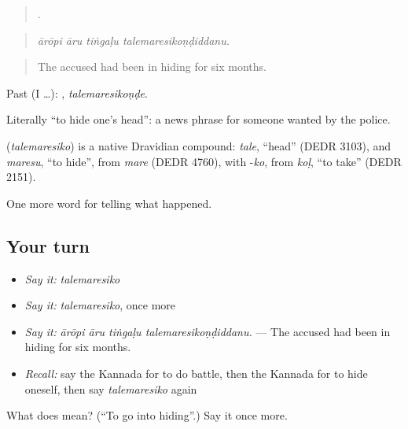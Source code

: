 \begin{quote}
   .
\end{quote}

\begin{quote}
\emph{ārōpi āru tiṅgaḷu talemaresikoṇḍiddanu.}
\end{quote}

\begin{quote}
The accused had been in hiding for six months.
\end{quote}

Past (I …): , \emph{talemaresikoṇḍe}.

Literally \textquotedblleft{}to hide one's head\textquotedblright{}: a news phrase for someone wanted by the police.

\begin{cousinweb}
\textbf{} (\emph{talemaresiko}) is a native Dravidian compound: \emph{tale}, \textquotedblleft{}head\textquotedblright{} (DEDR 3103), and \emph{maresu}, \textquotedblleft{}to hide\textquotedblright{}, from \emph{mare} (DEDR 4760), with -\emph{ko}, from \emph{koḷ}, \textquotedblleft{}to take\textquotedblright{} (DEDR 2151).
\end{cousinweb}

\begin{grammarlens}[title={What you've built}]
One more word for telling what happened.
\end{grammarlens}

\subsection*{Your turn}
\begin{itemize}
\raggedright
  \item \emph{Say it:} \emph{talemaresiko}
  \item \emph{Say it:} \emph{talemaresiko}, once more
  \item \emph{Say it:} \emph{ārōpi āru tiṅgaḷu talemaresikoṇḍiddanu.} — The accused had been in hiding for six months.
  \item \emph{Recall:} say the Kannada for to do battle, then the Kannada for to hide oneself, then say \emph{talemaresiko} again
\end{itemize}

\begin{tcolorbox}[breakable,colback=teal!4,colframe=teal!35!black,title={Before you move on}]
What does  mean? (\textquotedblleft{}To go into hiding\textquotedblright{}.) Say it once more.
\end{tcolorbox}
